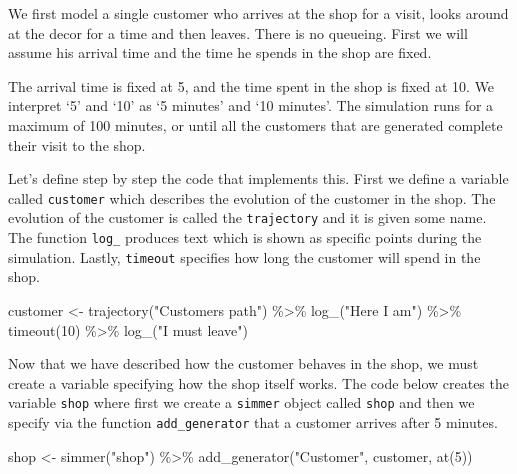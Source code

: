\documentclass[
]{book}
\newenvironment{Shaded}{\begin{snugshade}}{\end{snugshade}}
\newcommand{\DecValTok}[1]{\textcolor[rgb]{0.00,0.00,0.81}{#1}}
\newcommand{\FunctionTok}[1]{\textcolor[rgb]{0.00,0.00,0.00}{#1}}
\newcommand{\NormalTok}[1]{#1}
\newcommand{\OtherTok}[1]{\textcolor[rgb]{0.56,0.35,0.01}{#1}}
\newcommand{\SpecialCharTok}[1]{\textcolor[rgb]{0.00,0.00,0.00}{#1}}
\newcommand{\StringTok}[1]{\textcolor[rgb]{0.31,0.60,0.02}{#1}}
\begin{document}
We first model a single customer who arrives at the shop for a visit, looks around at the decor for a time and then leaves. There is no queueing. First we will assume his arrival time and the time he spends in the shop are fixed.

The arrival time is fixed at 5, and the time spent in the shop is fixed at 10. We interpret `5' and `10' as `5 minutes' and `10 minutes'. The simulation runs for a maximum of 100 minutes, or until all the customers that are generated complete their visit to the shop.

Let's define step by step the code that implements this. First we define a variable called \texttt{customer} which describes the evolution of the customer in the shop. The evolution of the customer is called the \texttt{trajectory} and it is given some name. The function \texttt{log\_} produces text which is shown as specific points during the simulation. Lastly, \texttt{timeout} specifies how long the customer will spend in the shop.

\begin{Shaded}
\begin{Highlighting}[]
\NormalTok{customer }\OtherTok{\textless{}{-}}
  \FunctionTok{trajectory}\NormalTok{(}\StringTok{"Customer\textquotesingle{}s path"}\NormalTok{) }\SpecialCharTok{\%\textgreater{}\%}
  \FunctionTok{log\_}\NormalTok{(}\StringTok{"Here I am"}\NormalTok{) }\SpecialCharTok{\%\textgreater{}\%}
  \FunctionTok{timeout}\NormalTok{(}\DecValTok{10}\NormalTok{) }\SpecialCharTok{\%\textgreater{}\%}
  \FunctionTok{log\_}\NormalTok{(}\StringTok{"I must leave"}\NormalTok{)}
\end{Highlighting}
\end{Shaded}

Now that we have described how the customer behaves in the shop, we must create a variable specifying how the shop itself works. The code below creates the variable \texttt{shop} where first we create a \texttt{simmer} object called \texttt{shop} and then we specify via the function \texttt{add\_generator} that a customer arrives after 5 minutes.

\begin{Shaded}
\begin{Highlighting}[]
\NormalTok{shop }\OtherTok{\textless{}{-}}
  \FunctionTok{simmer}\NormalTok{(}\StringTok{"shop"}\NormalTok{) }\SpecialCharTok{\%\textgreater{}\%}
  \FunctionTok{add\_generator}\NormalTok{(}\StringTok{"Customer"}\NormalTok{, customer, }\FunctionTok{at}\NormalTok{(}\DecValTok{5}\NormalTok{))}
\end{Highlighting}
\end{Shaded}
\end{document}
